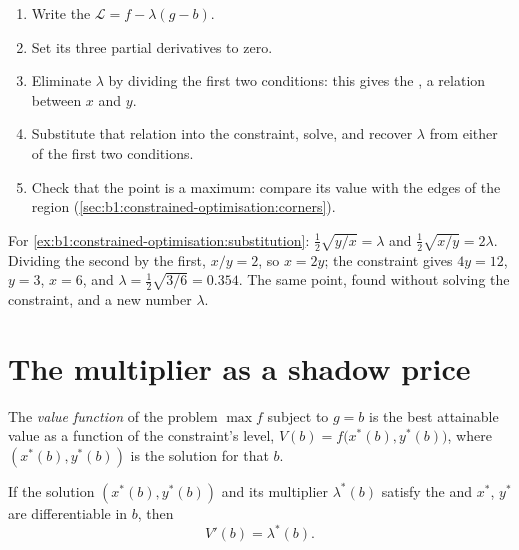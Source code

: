 \begin{method}\label{met:b1:constrained-optimisation:lagrange}
\begin{enumerate}
  \item Write the  $\mathcal L = f - \lambda(g - b)$.
  \item Set its three partial derivatives to zero.
  \item Eliminate $\lambda$ by dividing the first two conditions: this gives
    the , a relation between $x$ and $y$.
  \item Substitute that relation into the constraint, solve, and recover
    $\lambda$ from either of the first two conditions.
  \item Check that the point is a maximum: compare its value with the edges
    of the region (\cref{sec:b1:constrained-optimisation:corners}).
\end{enumerate}
\end{method}

For \cref{ex:b1:constrained-optimisation:substitution}: $\tfrac12\sqrt{y/x}
= \lambda$ and $\tfrac12\sqrt{x/y} = 2\lambda$. Dividing the second by the
first, $x/y = 2$, so $x = 2y$; the constraint gives $4y = 12$, $y = 3$,
$x = 6$, and $\lambda = \tfrac12\sqrt{3/6} = 0.354$. The same point, found
without solving the constraint, and a new number $\lambda$.

\section{The multiplier as a shadow price}\label{sec:b1:constrained-optimisation:shadow}

\begin{definition}\label{def:b1:constrained-optimisation:value-function}
The \emph{value function} of the problem $\max f$ subject to $g = b$ is the
best attainable value as a function of the constraint's level,
$V(b) = f\bigl(x^*(b), y^*(b)\bigr)$, where $(x^*(b), y^*(b))$ is the solution
for that $b$.
\end{definition}

\begin{proposition}\label{prop:b1:constrained-optimisation:shadow}
If the solution $(x^*(b), y^*(b))$ and its multiplier $\lambda^*(b)$ satisfy
the  and $x^*$, $y^*$ are differentiable in $b$, then
\[
V'(b) = \lambda^*(b).
\]
\end{proposition}

